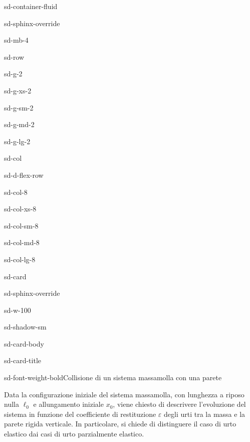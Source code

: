 \documentclass[letterpaper,10pt,italian]{jupyterBook}
\begin{document}
\begin{sphinxuseclass}{sd-container-fluid}
\begin{sphinxuseclass}{sd-sphinx-override}
\begin{sphinxuseclass}{sd-mb-4}
\begin{sphinxuseclass}{sd-row}
\begin{sphinxuseclass}{sd-g-2}
\begin{sphinxuseclass}{sd-g-xs-2}
\begin{sphinxuseclass}{sd-g-sm-2}
\begin{sphinxuseclass}{sd-g-md-2}
\begin{sphinxuseclass}{sd-g-lg-2}
\begin{sphinxuseclass}{sd-col}
\begin{sphinxuseclass}{sd-d-flex-row}
\begin{sphinxuseclass}{sd-col-8}
\begin{sphinxuseclass}{sd-col-xs-8}
\begin{sphinxuseclass}{sd-col-sm-8}
\begin{sphinxuseclass}{sd-col-md-8}
\begin{sphinxuseclass}{sd-col-lg-8}
\begin{sphinxuseclass}{sd-card}
\begin{sphinxuseclass}{sd-sphinx-override}
\begin{sphinxuseclass}{sd-w-100}
\begin{sphinxuseclass}{sd-shadow-sm}
\begin{sphinxuseclass}{sd-card-body}
\begin{sphinxuseclass}{sd-card-title}
\begin{sphinxuseclass}{sd-font-weight-bold}Collisione di un sistema massa\sphinxhyphen{}molla con una parete
\end{sphinxuseclass}
\end{sphinxuseclass}
\sphinxAtStartPar
Data la configurazione iniziale del sistema massa\sphinxhyphen{}molla, con lunghezza a riposo nulla \(\ell_0\) e allungamento iniziale \(x_0\), viene chiesto di descrivere l’evoluzione del sistema in funzione del coefficiente di restituzione \(\varepsilon\) degli urti tra la massa e la parete rigida verticale. In particolare, si chiede di distinguere il caso di urto elastico dai casi di urto parzialmente elastico.


\end{sphinxuseclass}
\end{sphinxuseclass}
\end{sphinxuseclass}
\end{sphinxuseclass}
\end{sphinxuseclass}
\end{sphinxuseclass}
\end{sphinxuseclass}
\end{sphinxuseclass}
\end{sphinxuseclass}
\end{sphinxuseclass}
\end{sphinxuseclass}
\end{sphinxuseclass}
\end{sphinxuseclass}
\end{sphinxuseclass}
\end{sphinxuseclass}
\end{sphinxuseclass}
\end{sphinxuseclass}
\end{sphinxuseclass}
\end{sphinxuseclass}
\end{sphinxuseclass}
\end{sphinxuseclass}
\end{document}
